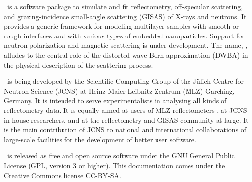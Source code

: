 

\cleardoublepage
{}


\BornAgain\ is a software package
to simulate and fit
reflectometry, off-specular scattering,
and grazing-incidence small-angle scattering (GISAS)
of X-rays and neutrons.
It provides a generic framework
for modeling multilayer samples with smooth or
rough interfaces and with various types of embedded nanoparticles.
Support for neutron polarization and magnetic scattering
is under development.
The name, \BornAgain,
alludes to the central role of the distorted-wave Born
approximation (DWBA) in the physical description of the
scattering process.

\BornAgain\ is being developed
by the Scientific Computing Group
of the J\"ulich Centre for Neutron Science (JCNS)
at Heinz Maier-Leibnitz Zentrum (MLZ) Garching, Germany.
It is intended to serve experimentalists in analysing all kinds
of reflectometry data.
It is equally aimed at users of MLZ reflectometers
\cite{mlz:maria,mlz:nrex,mlz:refsans},
at JCNS in-house researchers,
and at the reflectometry and GISAS community at large.
It is the main contribution of JCNS to national \cite{ba:hdri}
and international \cite{ba:sine2020} collaborations
of large-scale facilities for the development of better user software.

\BornAgain\ is released as free and open source software under
the GNU General Public License (GPL, version 3 or higher).
This documentation comes under the Creative Commons license CC-BY-SA.


